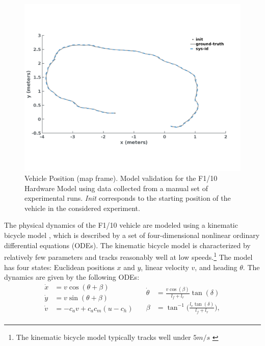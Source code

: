 \documentclass[manuscript,screen,review]{acmart}
\begin{document}
\begin{figure}[htbp]%
  \centering
    \includegraphics[width=0.70\linewidth]{figures/sys_id2_2.pdf}
  \caption{Vehicle Position (map frame). Model validation for the F1/10 Hardware Model using data collected from a manual set of experimental runs. \emph{Init} corresponds to the starting position of the vehicle in the considered experiment.}
  \label{fig:validation}
\end{figure}%


The physical dynamics of the F1/10 vehicle are modeled using a kinematic bicycle model \cite{Rajamani2012}, which is described by a set of four-dimensional nonlinear ordinary differential equations (ODEs). The kinematic bicycle model is characterized by relatively few parameters and tracks reasonably well at low speeds.\footnote{ The kinematic bicycle model typically tracks well under $5 m/s$ \cite{ivanov2020case}} The model has four states: Euclidean positions $x$ and $y$, linear velocity $v$, and heading $\theta$. The dynamics are given by the following ODEs: 
\begin{equation*}
    \begin{split}
        \Dot{x} & = v\cos(\theta +\beta)\\
    \Dot{y} & = v\sin(\theta + \beta)\\
    \Dot{v} & = -c_av +c_ac_m(u-c_h)\\
    \end{split}
    \quad
    \begin{split}
        \Dot{\theta} & = \frac{v\cos(\beta)}{l_f+l_r}\tan(\delta)\\
    \beta &= \tan^{-1}\Big(\frac{l_r\tan(\delta)}{l_f+l_r}\Big),
    \end{split}
\end{equation*}
\end{document}
